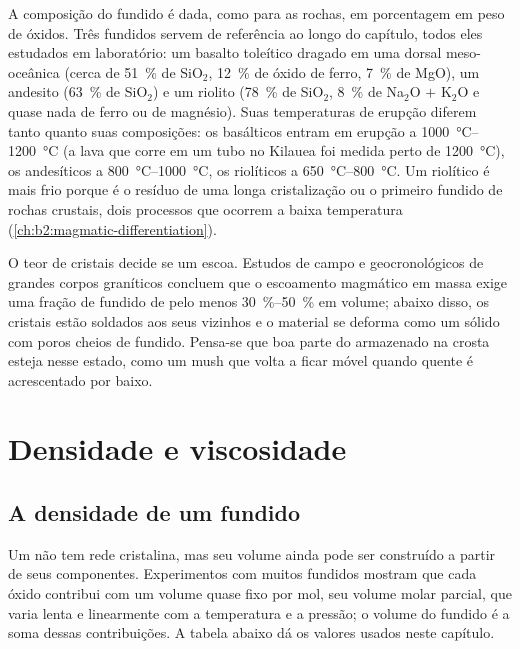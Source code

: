 A composição do fundido é dada, como para as rochas, em porcentagem em peso de
óxidos. Três fundidos servem de referência ao longo do capítulo, todos eles
estudados em laboratório: um basalto toleítico dragado em uma dorsal meso-oceânica
(cerca de \qty{51}{\percent} de SiO$_2$, \qty{12}{\percent} de óxido de ferro, \qty{7}{\percent}
de MgO), um andesito (\qty{63}{\percent} de SiO$_2$) e um riolito (\qty{78}{\percent} de
SiO$_2$, \qty{8}{\percent} de Na$_2$O $+$ K$_2$O e quase nada de ferro ou de magnésio).
Suas temperaturas de erupção diferem tanto quanto suas composições: os  basálticos
entram em erupção a \qtyrange{1000}{1200}{\celsius} (a lava que corre em um tubo no
Kilauea foi medida perto de \qty{1200}{\celsius}), os  andesíticos a
\qtyrange{800}{1000}{\celsius}, os  riolíticos a \qtyrange{650}{800}{\celsius}.
Um  riolítico é mais frio porque é o resíduo de uma longa cristalização
ou o primeiro fundido de rochas crustais, dois processos que ocorrem a baixa temperatura
(\cref{ch:b2:magmatic-differentiation}).

O teor de cristais decide se um  escoa. Estudos de campo e geocronológicos
de grandes corpos graníticos concluem que o escoamento magmático em massa exige uma fração
de fundido de pelo menos \qtyrange{30}{50}{\percent} em volume; abaixo disso, os
cristais estão soldados aos seus vizinhos e o material se deforma como um sólido com
poros cheios de fundido. Pensa-se que boa parte do  armazenado na crosta esteja
nesse estado, como um mush que volta a ficar móvel quando  quente é acrescentado por
baixo.

\section{Densidade e viscosidade}

\subsection{A densidade de um fundido}

Um  não tem rede cristalina, mas seu volume ainda pode ser construído a partir
de seus componentes. Experimentos com muitos fundidos mostram que cada óxido contribui com um
volume quase fixo por mol, seu volume molar parcial, que varia lenta e
linearmente com a temperatura e a pressão; o volume do fundido é a soma
dessas contribuições. A tabela abaixo dá os valores usados neste capítulo.

